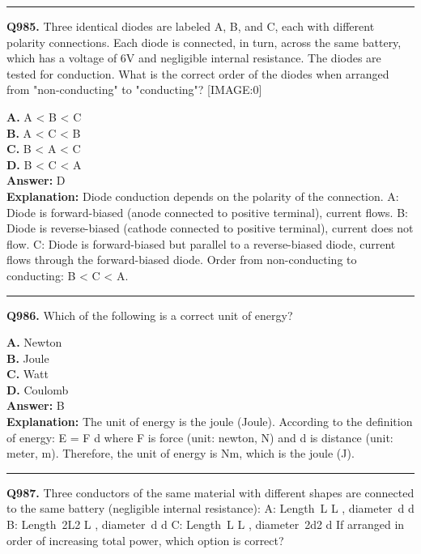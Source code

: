 \documentclass[12pt]{article}
\begin{document}
\hrule
\vspace{1em}


\noindent
\textbf{Q985.} Three identical diodes are labeled A, B, and C, each with different polarity connections. Each diode is connected, in turn, across the same battery, which has a voltage of 6V and negligible internal resistance. The diodes are tested for conduction. What is the correct order of the diodes when arranged from "non-conducting" to "conducting"?
[IMAGE:0]



\textbf{A.} A < B < C \\
\textbf{B.} A < C < B \\
\textbf{C.} B < A < C \\
\textbf{D.} B < C < A \\

\textbf{Answer:} D \\
\textbf{Explanation:} Diode conduction depends on the polarity of the connection.
A: Diode is forward-biased (anode connected to positive terminal), current flows.
B: Diode is reverse-biased (cathode connected to positive terminal), current does not flow.
C: Diode is forward-biased but parallel to a reverse-biased diode, current flows through the forward-biased diode.
Order from non-conducting to conducting: B < C < A.

\hrule
\vspace{1em}


\noindent
\textbf{Q986.} Which of the following is a correct unit of energy?



\textbf{A.} Newton \\
\textbf{B.} Joule \\
\textbf{C.} Watt \\
\textbf{D.} Coulomb \\

\textbf{Answer:} B \\
\textbf{Explanation:} The unit of energy is the joule (Joule). According to the definition of energy:
E
=
F
\cdot 
d
where
F
is force (unit: newton, N) and
d
is distance (unit: meter, m). Therefore, the unit of energy is N\cdot m, which is the joule (J).

\hrule
\vspace{1em}


\noindent
\textbf{Q987.} Three conductors of the same material with different shapes are connected to the same battery (negligible internal resistance):
\cdot 
A: Length L
L
, diameter d
d
\cdot 
B: Length 2L2
L
, diameter d
d
\cdot 
C: Length L
L
, diameter 2d2
d
If arranged in order of increasing total power, which option is correct?
\end{document}
